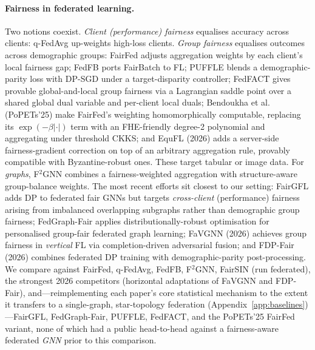 \documentclass[pdflatex,sn-mathphys-num]{sn-jnl}
\theoremstyle{thmstyleone}%
\theoremstyle{thmstyletwo}%
\theoremstyle{thmstylethree}%
\begin{document}
\paragraph{Fairness in federated learning.}
Two notions coexist. \emph{Client (performance) fairness} equalises accuracy
across clients: q-FedAvg \cite{li2020fair} up-weights high-loss clients.
\emph{Group fairness} equalises outcomes across demographic groups: FairFed
\cite{ezzeldin2023fairfed} adjusts aggregation weights by each client's local
fairness gap; FedFB ports FairBatch to FL; PUFFLE \cite{corbucci2024puffle}
blends a demographic-parity loss with DP-SGD under a target-disparity
controller; FedFACT \cite{fedfact2025} gives provable global-and-local group
fairness via a Lagrangian saddle point over a shared global dual variable and
per-client local duals; Bendoukha et al.\ \cite{bendoukha2025popets}
(PoPETs'25) make FairFed's weighting homomorphically computable, replacing its
$\exp(-\beta|\cdot|)$ term with an FHE-friendly degree-2 polynomial and
aggregating under threshold CKKS; and EquFL \cite{yu2026equfl} (2026) adds a
server-side fairness-gradient correction on top of an arbitrary aggregation
rule, provably compatible with Byzantine-robust ones. These target tabular or
image data. For
\emph{graphs}, F$^2$GNN \cite{f2gnn2023} combines a fairness-weighted
aggregation with structure-aware group-balance weights. The most recent
efforts sit closest to our setting: FairGFL \cite{fairgfl2025} adds DP to
federated fair GNNs but targets \emph{cross-client} (performance) fairness
arising from imbalanced overlapping subgraphs rather than demographic group
fairness; FedGraph-Fair \cite{fedgraphfair2025} applies distributionally-robust
optimisation for personalised group-fair federated graph learning; FaVGNN
\cite{wang2026favgnn} (2026) achieves group fairness in \emph{vertical} FL via
completion-driven adversarial fusion; and FDP-Fair \cite{xue2026fdpfair} (2026)
combines federated DP training with demographic-parity post-processing. We
compare against FairFed, q-FedAvg, FedFB, F$^2$GNN, FairSIN (run federated),
the strongest 2026 competitors (horizontal adaptations of FaVGNN and FDP-Fair),
and---reimplementing each paper's core statistical mechanism to the extent it
transfers to a single-graph, star-topology federation
(Appendix~\ref{app:baselines})---FairGFL, FedGraph-Fair, PUFFLE, FedFACT, and
the PoPETs'25 FairFed variant, none of which had a public head-to-head against
a fairness-aware federated \emph{GNN} prior to this comparison.
\end{document}
